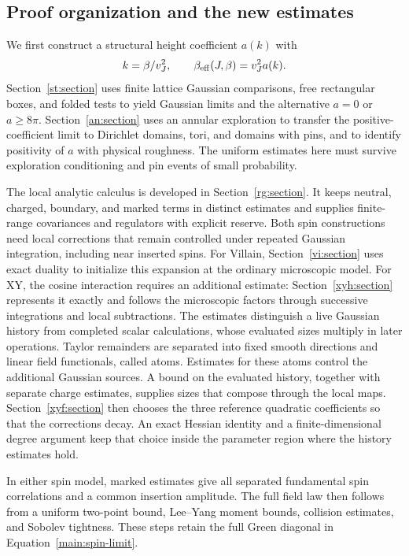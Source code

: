 \subsection{Proof organization and the new estimates}

We first construct a structural height coefficient $a(k)$ with
\begin{equation}\label{main:coefficient-convention}
 k=\beta/v_J^2,\qquad \beta_{\mathrm{eff}}(J,\beta)=v_J^2a(k).
\end{equation}
Section~\ref{st:section} uses finite lattice Gaussian comparisons, free rectangular boxes, and folded
tests to yield Gaussian limits and the alternative $a=0$ or $a\ge8\pi$.
Section~\ref{an:section} uses an annular exploration to transfer the positive-coefficient limit to
Dirichlet domains, tori, and domains with pins, and to identify positivity
of $a$ with physical roughness.  The uniform estimates here must survive
exploration conditioning and pin events of small probability.

The local analytic calculus is developed in Section~\ref{rg:section}.
It keeps neutral, charged, boundary, and marked terms in distinct
estimates and supplies finite-range covariances and regulators with
explicit reserve.  Both spin constructions need local corrections that
remain controlled under repeated Gaussian integration, including near
inserted spins.  For Villain, Section~\ref{vi:section} uses exact duality
to initialize this expansion at the ordinary microscopic model.
For XY, the cosine interaction requires an additional estimate:
Section~\ref{xyh:section} represents it exactly and follows the
microscopic factors through successive integrations and local
subtractions.  The estimates distinguish a live Gaussian history from
completed scalar calculations, whose evaluated sizes multiply in later
operations.  Taylor remainders are
separated into fixed smooth directions and linear field functionals,
called atoms.  Estimates for these atoms control the additional
Gaussian sources.  A bound on the
evaluated history, together with separate charge estimates, supplies
sizes that compose through the local maps.  Section~\ref{xyf:section}
then chooses the three reference quadratic coefficients so that the
corrections decay.  An exact Hessian identity and a finite-dimensional
degree argument keep that choice inside the parameter region where
the history estimates hold.

In either spin model, marked estimates give all separated fundamental
spin correlations and a common insertion amplitude.  The full field law
then follows from a uniform two-point bound, Lee--Yang moment bounds,
collision estimates, and Sobolev tightness.  These steps retain the full
Green diagonal in Equation~\eqref{main:spin-limit}.

